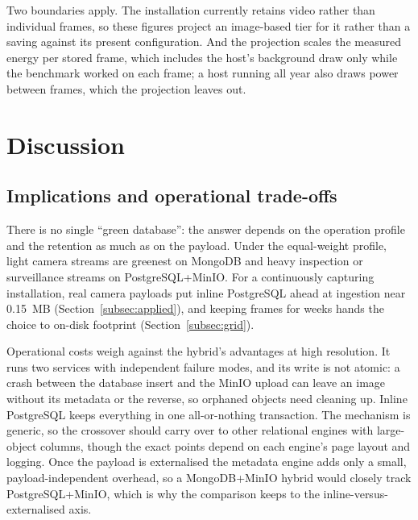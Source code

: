 \documentclass[pdflatex,sn-basic]{sn-jnl}%
\begin{document}
{\color{markup}Two boundaries apply.} {\color{markup}The installation currently retains video rather than individual frames, so these figures project an image-based tier for it rather than a saving against its present configuration.} {\color{markup}And the projection scales the measured energy per stored frame, which includes the host's background draw only while the benchmark worked on each frame; a host running all year also draws power between frames, which the projection leaves out.}

\section{Discussion}\label{sec:discussion}

\subsection{{\color{markup}Implications and operational trade-offs}}
{\color{markup}There is no single ``green database'': the answer depends on the operation profile and the retention as much as on the payload.} {\color{markup}Under the equal-weight profile, light camera streams are greenest on MongoDB and heavy inspection or surveillance streams on PostgreSQL+MinIO.} {\color{markup}For a continuously capturing installation, real camera payloads put inline PostgreSQL ahead at ingestion near 0.15~MB (Section~\ref{subsec:applied}), and keeping frames for weeks hands the choice to on-disk footprint (Section~\ref{subsec:grid}).}

{\color{markup}Operational costs weigh against the hybrid's advantages at high resolution.} {\color{markup}It runs two services with independent failure modes, and its write is not atomic: a crash between the database insert and the MinIO upload can leave an image without its metadata or the reverse, so orphaned objects need cleaning up.} {\color{markup}Inline PostgreSQL keeps everything in one all-or-nothing transaction.} {\color{markup}The mechanism is generic, so the crossover should carry over to other relational engines with large-object columns, though the exact points depend on each engine's page layout and logging.} {\color{markup}Once the payload is externalised the metadata engine adds only a small, payload-independent overhead, so a MongoDB+MinIO hybrid would closely track PostgreSQL+MinIO, which is why the comparison keeps to the inline-versus-externalised axis.}
\end{document}
